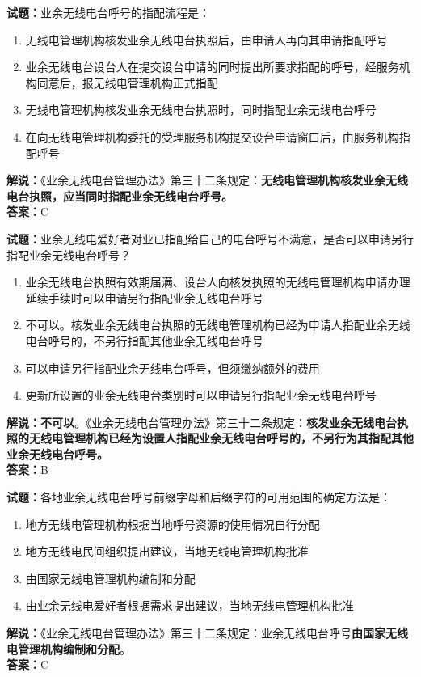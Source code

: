 \documentclass{ctexbook}
\begin{document}
\noindent\textbf{试题：}业余无线电台呼号的指配流程是：
\begin{enumerate}[leftmargin=3em]
\item 无线电管理机构核发业余无线电台执照后，由申请人再向其申请指配呼号
\item 业余无线电台设台人在提交设台申请的同时提出所要求指配的呼号，经服务机构同意后，报无线电管理机构正式指配
\item 无线电管理机构核发业余无线电台执照时，同时指配业余无线电台呼号
\item 在向无线电管理机构委托的受理服务机构提交设台申请窗口后，由服务机构指配呼号
\end{enumerate}
\noindent\textbf{解说：}《业余无线电台管理办法》第三十二条规定：\textbf{无线电管理机构核发业余无线电台执照，应当同时指配业余无线电台呼号。}\\\noindent\textbf{答案：}C



\bigskip


\noindent\textbf{试题：}业余无线电爱好者对业已指配给自己的电台呼号不满意，是否可以申请另行指配业余无线电台呼号？
\begin{enumerate}[leftmargin=3em]
\item 业余无线电台执照有效期届满、设台人向核发执照的无线电管理机构申请办理延续手续时可以申请另行指配业余无线电台呼号
\item 不可以。核发业余无线电台执照的无线电管理机构已经为申请人指配业余无线电台呼号的，不另行指配其他业余无线电台呼号
\item 可以申请另行指配业余无线电台呼号，但须缴纳额外的费用
\item 更新所设置的业余无线电台类别时可以申请另行指配业余无线电台呼号
\end{enumerate}
\textbf{解说：不可以}。《业余无线电台管理办法》第三十二条规定：\textbf{核发业余无线电台执照的无线电管理机构已经为设置人指配业余无线电台呼号的，不另行为其指配其他业余无线电台呼号。}\\\noindent\textbf{答案：}B




\bigskip


\noindent\textbf{试题：}各地业余无线电台呼号前缀字母和后缀字符的可用范围的确定方法是：
\begin{enumerate}[leftmargin=3em]
\item 地方无线电管理机构根据当地呼号资源的使用情况自行分配
\item 地方无线电民间组织提出建议，当地无线电管理机构批准
\item 由国家无线电管理机构编制和分配
\item 由业余无线电爱好者根据需求提出建议，当地无线电管理机构批准
\end{enumerate}
\noindent\textbf{解说：}《业余无线电台管理办法》第三十二条规定：业余无线电台呼号\textbf{由国家无线电管理机构编制和分配}。\\\noindent\textbf{答案：}C
\end{document}
